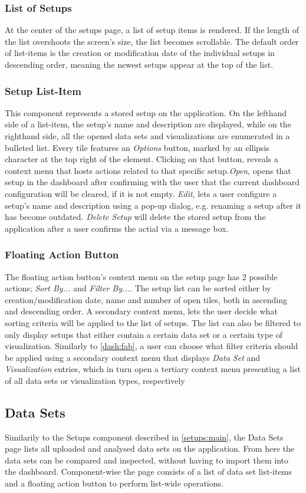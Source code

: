\subsubsection{List of Setups}
At the center of the setups page, a list of setup items is rendered. If the length of the list overshoots the screen's size, the list becomes scrollable. The default order of list-items is the creation or modification date of the individual setups in descending order, meaning the newest setups appear at the top of the list.
\subsubsection{Setup List-Item}
This component represents a stored setup on the application. On the lefthand side of a list-item, the setup's name and description are displayed, while on the righthand side, all the opened data sets and visualizations are enumerated in a bulleted list. Every tile features an \emph{Options} button, marked by an ellipsis character at the top right of the element. Clicking on that button, reveals a context menu that hosts actions related to that specific setup.\emph{Open}, opens that setup in the dashboard after confirming with the user that the current dashboard configuration will be cleared, if it is not empty. \emph{Edit}, lets a user configure a setup's name and description using a pop-up dialog, e.g. renaming a setup after it has become outdated. \emph{Delete Setup} will delete the stored setup from the application after a user confirms the actial via a message box.
\subsubsection{Floating Action Button}
The floating action button's context menu on the setup page has 2 possible actions; \emph{Sort By...} and \emph{Filter By...}. The setup list can be sorted either by creation/modification date, name and number of open tiles, both in ascending and descending order. A secondary context menu, lets the user decide what sorting criteria will be applied to the list of setups. The list can also be filtered to only display setups that either contain a certain data set or a certain type of visualization. Similarly to \ref{dash:fab}, a user can choose what filter criteria should be applied using a secondary context menu that displays \emph{Data Set} and \emph{Visualization} entries, which in turn open a tertiary context menu presenting a list of all data sets or visualization types, respectively
\subsection{Data Sets}
Similarily to the Setups component described in \ref{setups:main}, the Data Sets page lists all uploaded and analysed data sets on the application. From here the data sets can be compared and inspected, without having to import them into the dashboard. Component-wise the page consists of a list of data set list-items and a floating action button to perform list-wide operations.
